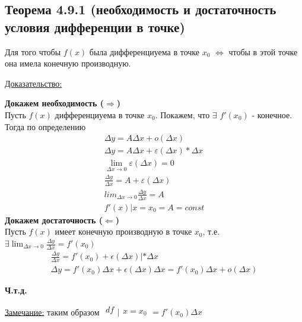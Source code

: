 \documentclass[12pt]{article}
\begin{document}
    \subsection*{Теорема 4.9.1 (необходимость и достаточность условия дифференции в точке)}\label{th:4.9.1}
    Для того чтобы $f(x)$ была дифференциуема в точке $x_0$ $\Leftrightarrow$ чтобы в этой точке она имела конечную производную.\par\noindent
    \underline{Доказательство:}
    \begin{adjustwidth}{1.5em}{1.5em}
        \textbf{Докажем необходимость ($\Rightarrow$)}\\
        Пусть $f(x)$ дифференциуема в точке $x_0$. Покажем, что $\exists$ $f'(x_0)$ - конечное.\\
        Тогда по определению 
        \begin{gather*}
            \Delta y = A \Delta x+o(\Delta x)\\
            \Delta y = A \Delta x+ \varepsilon(\Delta x)*\Delta x\\
            \lim_{\Delta x \to 0}{\varepsilon(\Delta x)}= 0\\
            \frac{\Delta y}{\Delta x}=A+\varepsilon(\Delta x)\\
            lim_{\Delta x \to 0}{\frac{\Delta y}{\Delta x}}=A\\
            f'(x)|x=x_0=A=const
        \end{gather*}
        \textbf{Докажем достаточность ($\Leftarrow$)}\\
        Пусть $f(x)$ имеет конечную производную в точке $x_0$, т.е. $\exists \lim_{\Delta x \to 0}{\frac{\Delta y}{\Delta x}}=f'(x_0)$\\
        \begin{gather*}
            \frac{\Delta y}{\Delta x}=f'(x_0)+\epsilon(\Delta x)|*\Delta x\\
            \Delta y=f'(x_0)\Delta x+\epsilon(\Delta x)\Delta x= f'(x_0)\Delta x+o(\Delta x)    
        \end{gather*}
        \begin{center}
            \textbf{Ч.т.д.}
        \end{center}    
    \end{adjustwidth}
    \underline{Замечание:} таким образом $\begin{matrix}df\\\\\end{matrix}\Big|\begin{matrix}\\x = x_0\\\end{matrix}=f'(x_0)\Delta x$
\end{document}
